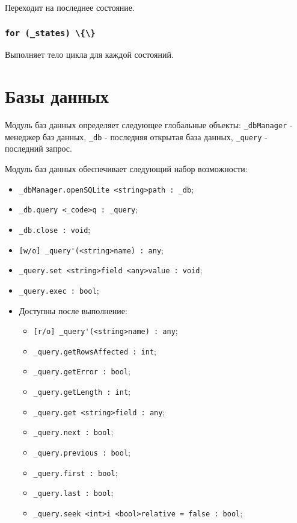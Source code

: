 \documentclass[a4paper, 14pt]{extarticle}
\newenvironment{icItems}
	{ \begin{itemize} [noitemsep,nolistsep] }
	{ \end{itemize} }
\begin{document}
Переходит на последнее состояние.

\subsubsection{\lstinline|for (_states) \{\}|}

Выполняет тело цикла для каждой состояний.

\section{Базы данных}

Модуль баз данных определяет следующее глобальные объекты: \lstinline|_dbManager| - менеджер баз данных, \lstinline|_db| - последняя открытая база данных, \lstinline|_query| - последний запрос.

Модуль баз данных обеспечивает следующий набор возможности:
\begin{icItems}
	\item \lstinline|_dbManager.openSQLite <string>path : _db|;
	\item \lstinline|_db.query <_code>q : _query|;
	\item \lstinline|_db.close : void|;
	\item \lstinline|[w/o] _query'(<string>name) : any|;
	\item \lstinline|_query.set <string>field <any>value : void|;
	\item \lstinline|_query.exec : bool|;
	\item Доступны после выполнение:
	\begin{icItems}
		\item \lstinline|[r/o] _query'(<string>name) : any|;
		\item \lstinline|_query.getRowsAffected : int|;
		\item \lstinline|_query.getError : bool|;
		\item \lstinline|_query.getLength : int|;
		\item \lstinline|_query.get <string>field : any|;
		\item \lstinline|_query.next : bool|;
		\item \lstinline|_query.previous : bool|;
		\item \lstinline|_query.first : bool|;
		\item \lstinline|_query.last : bool|;
		\item \lstinline|_query.seek <int>i <bool>relative = false : bool|;
	\end{icItems}
\end{icItems}
\end{document}
